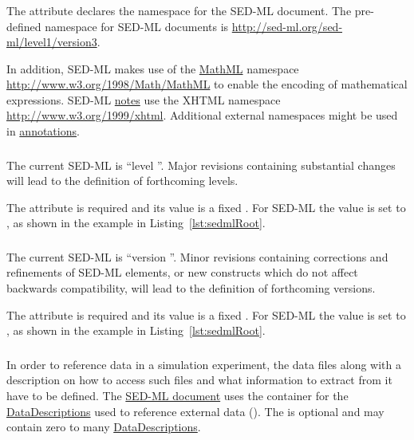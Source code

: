 \subsubsection{}
\label{sec:xmlns}
The  attribute declares the namespace for the SED-ML document. The pre-defined namespace for SED-ML documents is \url{http://sed-ml.org/sed-ml/level1/version3}. 

In addition, SED-ML makes use of the \hyperref[sec:mathML]{MathML} namespace \url{http://www.w3.org/1998/Math/MathML} to enable the encoding of mathematical expressions. SED-ML \hyperref[class:notes]{notes} use the XHTML namespace \url{http://www.w3.org/1999/xhtml}. Additional external namespaces might be used in \hyperref[class:annotation]{annotations}.

\subsubsection{}
\label{sec:level}
The current SED-ML  is ``level \level''. Major revisions containing substantial changes will lead to the definition of forthcoming levels.

The  attribute is required and its value is a fixed . For SED-ML \currentLV the value is set to \code{\level}, as shown in the example in Listing~\ref{lst:sedmlRoot}.

\subsubsection{}
\label{sec:version}
The current SED-ML  is ``version \version''. Minor revisions containing corrections and refinements of SED-ML elements, or new constructs which do not affect backwards compatibility, will lead to the definition of forthcoming versions.

The  attribute is required and its value is a fixed . For SED-ML \currentLV the value is set to \code{\version}, as shown in the example in Listing~\ref{lst:sedmlRoot}.

\subsubsection{}
\label{sec:listOfDataDescriptions}
In order to reference data in a simulation experiment, the data files along with a description on how to access such files and what information to extract from it have to be defined. The \hyperref[class:sed-ml]{SED-ML document} uses the  container for the \hyperref[class:dataDescription]{DataDescriptions} used to reference external data (). The  is optional and may contain zero to many \hyperref[class:dataDescription]{DataDescriptions}.

